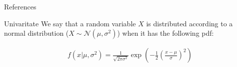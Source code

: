 \documentclass[10pt]{beamer}
\numberwithin{equation}{section}
\begin{document}
    \begin{frame}{}

    \end{frame}

    \begin{frame}{References}
        \printbibliography
    \end{frame}

    \begin{frame}{Univaritate}
        We say that a random variable $X$ is distributed
        according to a normal distribution ($X \sim \mathcal{N}(\mu, \sigma^2)$) when it has the following pdf:

        \begin{definition}
            \begin{align}
                \label{eq:pdf_normal_dist}
                f(x|\mu, \sigma^2) = \frac{1}{\sqrt{2\pi\sigma^2}}
                \exp{\left(-\frac{1}{2}\left(\frac{x-\mu}{\sigma}\right)^2\right)}
            \end{align}
        \end{definition}
    \end{frame}
\end{document}
